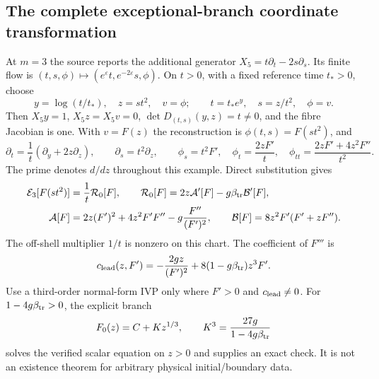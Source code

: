 \documentclass[11pt]{article}
\theoremstyle{definition}
\newcommand{\E}{\mathcal E}
\begin{document}
\subsection{The complete exceptional-branch coordinate transformation}
At $m=3$ the source reports the additional generator
$X_5=t\partial_t-2s\partial_s$. Its finite flow is
$(t,s,\phi)\mapsto(e^\varepsilon t,e^{-2\varepsilon}s,\phi)$.
On $t>0$, with a fixed reference time $t_*>0$, choose
\begin{equation}
 y=\log(t/t_*),\quad z=st^2,\quad v=\phi;
 \qquad t=t_*e^y,\quad s=z/t^2,\quad \phi=v.
 \label{eq:sve-chart}
\end{equation}
Then $X_5y=1$, $X_5z=X_5v=0$,
$\det D_{(t,s)}(y,z)=t\ne0$, and the fibre Jacobian is one.
With $v=F(z)$ the reconstruction is $\phi(t,s)=F(st^2)$, and
\begin{equation}
 \partial_t=\frac1t(\partial_y+2z\partial_z),\qquad
 \partial_s=t^2\partial_z,
 \qquad
 \phi_s=t^2F',\quad \phi_t=\frac{2zF'}t,
 \quad \phi_{tt}=\frac{2zF'+4z^2F''}{t^2}.
 \label{eq:sve-chain-rule}
\end{equation}
The prime denotes $d/dz$ throughout this example. Direct substitution gives
\begin{align}
 \E_3[F(st^2)]&=\frac1t\mathcal R_0[F],\qquad
 \mathcal R_0[F]=2z\mathcal A'[F]-g\beta_{\rm tr}\mathcal B'[F],\label{eq:reduction}\\
 \mathcal A[F]&=2z(F')^2+4z^2F'F''-g\frac{F''}{(F')^2},\qquad
 \mathcal B[F]=8z^2F'(F'+zF'').\nonumber
\end{align}
The off-shell multiplier $1/t$ is nonzero on this chart. The coefficient of
$F'''$ is
\begin{equation}
 c_{\rm lead}(z,F')=-\frac{2gz}{(F')^2}
                       +8(1-g\beta_{\rm tr})z^3F'.
 \label{eq:sve-leading}
\end{equation}
Use a third-order normal-form IVP only where $F'>0$ and
$c_{\rm lead}\ne0$. For $1-4g\beta_{\rm tr}>0$, the explicit branch
\begin{equation}
 F_0(z)=C+Kz^{1/3},\qquad K^3=\frac{27g}{1-4g\beta_{\rm tr}}
 \label{eq:sve-exact}
\end{equation}
solves the verified scalar equation on $z>0$ and supplies an exact check.
It is not an existence theorem for arbitrary physical initial/boundary data.
\end{document}
